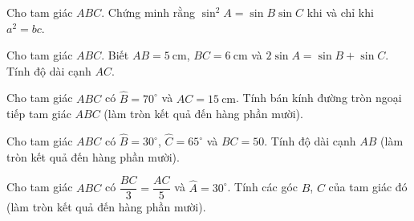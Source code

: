 \begin{vd}%
	Cho tam giác $ABC$. Chứng minh rằng  $\sin^2 A = \sin B \sin C$ khi và chỉ khi $a^2 = bc$. 
\end{vd}

\begin{vd}%
	Cho tam giác $ABC$.  Biết $AB= 5 \mathrm{~cm}$,  $BC= 6 \mathrm{~cm}$ và $2\sin A = \sin B + \sin C$. Tính độ dài cạnh $AC$. 
\end{vd}

\baitaptl

\begin{bt}%
	Cho tam giác $ABC$ có $\widehat{B}= 70^\circ$ và $AC= 15 \mathrm{~cm}$. Tính bán kính đường tròn ngoại tiếp tam giác $ABC$ (làm tròn kết quả đến hàng phần mười).
\end{bt}


\begin{bt}%
	Cho tam giác $ABC$ có $\widehat{B}= 30^\circ$, $\widehat{C}=65^\circ$ và $BC = 50$. Tính độ dài cạnh $AB$ (làm tròn kết quả đến hàng phần mười).
\end{bt}

\begin{bt}%
	Cho tam giác $ABC$ có $\dfrac{BC}{3} = \dfrac{AC}{5}$ và $\widehat{A} = 30^\circ$. Tính các góc $B$, $C$  của tam giác đó (làm tròn kết quả đến hàng phần mười).
\end{bt}

